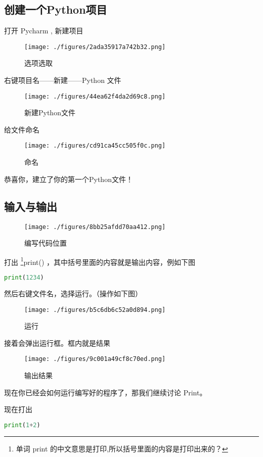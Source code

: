 
\subsection{创建一个Python项目}

打开 Pycharm , 新建项目

\begin{figure}[ht]
\centering
\texttt{[image: ./figures/2ada35917a742b32.png]}
\caption{选项选取} \label{fig_Pyc2_2}
\end{figure}

右键项目名——新建——Python 文件

\begin{figure}[ht]
\centering
\texttt{[image: ./figures/44ea62f4da2d69c8.png]}
\caption{新建Python文件} \label{fig_Pyc2_1}
\end{figure}

给文件命名

\begin{figure}[ht]
\centering
\texttt{[image: ./figures/cd91ca45cc505f0c.png]}
\caption{命名} \label{fig_Pyc2_3}
\end{figure}

恭喜你，建立了你的第一个Python文件！

\subsection{输入与输出}

\begin{figure}[ht]
\centering
\texttt{[image: ./figures/8bb25afdd70aa412.png]}
\caption{编写代码位置} \label{fig_Pyc2_4}
\end{figure}

打出 \footnote{单词 print 的中文意思是打印,所以括号里面的内容是打印出来的？}print() ，其中括号里面的内容就是输出内容，例如下图

\begin{lstlisting}[language=python]
print(1234)
\end{lstlisting}

然后右键文件名，选择运行。（操作如下图）

\begin{figure}[ht]
\centering
\texttt{[image: ./figures/b5c6db6c52a0d894.png]}
\caption{运行} \label{fig_Pyc2_5}
\end{figure}

接着会弹出运行框。框内就是结果

\begin{figure}[ht]
\centering
\texttt{[image: ./figures/9c001a49cf8c70ed.png]}
\caption{输出结果} \label{fig_Pyc2_6}
\end{figure}

现在你已经会如何运行编写好的程序了，那我们继续讨论 Print。

现在打出

\begin{lstlisting}[language=python]
print(1+2)
\end{lstlisting}


